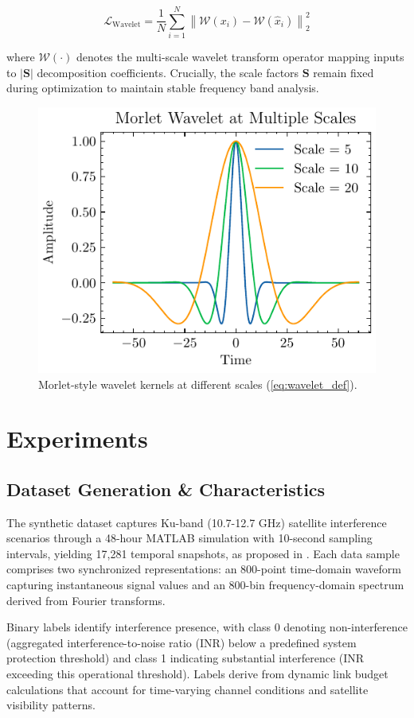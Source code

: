 \documentclass[12pt]{article}
\begin{document}
\begin{equation}
    \mathcal{L}_{\text{Wavelet}} = \frac{1}{N}\sum_{i=1}^{N} \left\lVert \mathcal{W}(x_i) - \mathcal{W}(\hat{x}_i) \right\rVert_2^2
    \label{eq:wavelet_loss}
\end{equation}

where $\mathcal{W}(\cdot)$ denotes the multi-scale wavelet transform operator mapping inputs to $|\mathbf{S}|$ decomposition coefficients. Crucially, the scale factors $\mathbf{S}$ remain fixed during optimization to maintain stable frequency band analysis.



\begin{figure}[htbp]
    \centering
    \includegraphics[width=0.5\linewidth]{wavelet-scales.pdf}
    \caption{Morlet-style wavelet kernels at different scales (\autoref{eq:wavelet_def}).}
    \label{fig:wavelet_scales}
\end{figure}

\section{Experiments}

\subsection{Dataset Generation \& Characteristics}
\label{sec:dataset}

The synthetic dataset captures Ku-band (10.7-12.7 GHz) satellite interference scenarios through a 48-hour MATLAB simulation with 10-second sampling intervals, yielding 17,281 temporal snapshots, as proposed in \cite{saifaldawlaGenAIBasedModelsNGSO2024}. Each data sample comprises two synchronized representations: an 800-point time-domain waveform capturing instantaneous signal values and an 800-bin frequency-domain spectrum derived from Fourier transforms.

Binary labels identify interference presence, with class 0 denoting non-interference (aggregated interference-to-noise ratio (INR) below a predefined system protection threshold) and class 1 indicating substantial interference (INR exceeding this operational threshold). Labels derive from dynamic link budget calculations that account for time-varying channel conditions and satellite visibility patterns.
\end{document}
